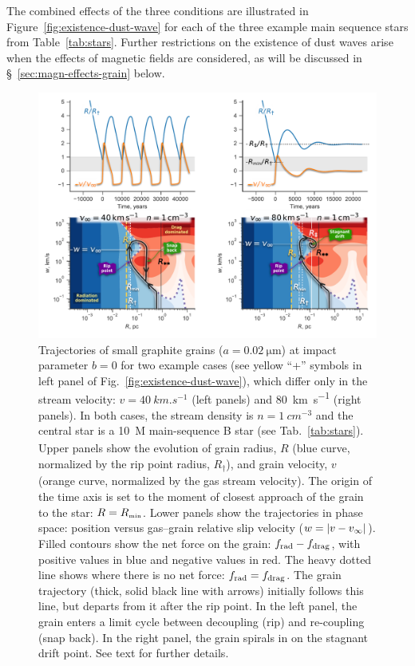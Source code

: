 The combined effects of the three conditions are illustrated in
Figure~\ref{fig:existence-dust-wave} for each of the three example
main sequence stars from Table~\ref{tab:stars}.  Further restrictions
on the existence of dust waves arise when the effects of magnetic
fields are considered, as will be discussed in
\S~\ref{sec:magn-effects-grain} below.

\begin{figure}
  \centering
  \includegraphics[width=\linewidth]{figs/dust-wave-phase-trajectories-annotate}
  \caption{Trajectories of small graphite grains
    (\(a = \SI{0.02}{\um}\)) at impact parameter \(b = 0\) for two
    example cases (see yellow ``+'' symbols in left panel of
    Fig.~\ref{fig:existence-dust-wave}), which differ only in the
    stream velocity: \(v = \SI{40}{km.s^{-1}}\) (left panels) and
    \SI{80}{km.s^{-1}} (right panels).  In both cases, the stream
    density is \(n = \SI{1}{cm^{-3}}\) and the central star is a
    \SI{10}{M_\odot} main-sequence B star (see Tab.~\ref{tab:stars}).
    Upper panels show the evolution of grain radius, \(R\) (blue
    curve, normalized by the rip point radius, \(R_\dag\)), and grain
    velocity, \(v\) (orange curve, normalized by the gas stream
    velocity).  The origin of the time axis is set to the moment of
    closest approach of the grain to the star: \(R = R_{\scriptscriptstyle\text{min}}\).  Lower
    panels show the trajectories in phase space: position versus
    gas--grain relative slip velocity (\(w = \lvert v - v_\infty\rvert\)).  Filled
    contours show the net force on the grain: \(f_{\text{rad}} - f_{\text{drag}}\), with
    positive values in blue and negative values in red.  The heavy
    dotted line shows where there is no net force: \(f_{\text{rad}} = f_{\text{drag}}\).
    The grain trajectory (thick, solid black line with arrows)
    initially follows this line, but departs from it after the rip
    point. In the left panel, the grain enters a limit cycle between
    decoupling (rip) and re-coupling (snap back).  In the right panel,
    the grain spirals in on the stagnant drift point.  See text for
    further details.}
    \label{fig:phase-space-trajectories}
\end{figure}

